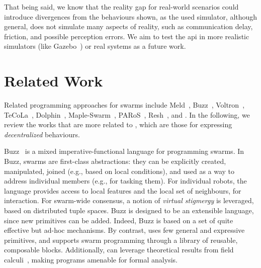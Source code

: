 That being said, we know that the reality gap for real-world scenarios could introduce divergences from the behaviours shown, as the used simulator, although general, does not simulate many aspects of reality, such as communication delay, friction, and possible perception errors. 
%
We aim to test the \ac{api} in more realistic simulators (like Gazebo~\cite{DBLP:conf/iros/KoenigH04}) or real systems as a future work.

\section{Related Work}
\label{coordination2023-macro:sec:rw}

Related programming approaches for swarms 
 include 
 Meld~\cite{Meld2007},
 Buzz~\cite{DBLP:conf/iros/PinciroliB16},
 Voltron~\cite{Mottola2014voltron},
 TeCoLa~\cite{Koutsoubelias2016tecola},
 Dolphin~\cite{lima2018dolphin},
 Maple-Swarm~\cite{DBLP:conf/isola/KosakHBWHR20}, 
 PARoS~\cite{paros},
 Resh~\cite{DBLP:conf/icra/CarrollNS21}, 
 and \cite{DBLP:conf/iros/YiDLD0WY20}.
%
%
In the following, we review the works that are more related to \MacroSwarm{},
 which are those for expressing \emph{decentralized} behaviours.
 

Buzz~\cite{DBLP:conf/iros/PinciroliB16}
 is a mixed imperative-functional language for programming swarms.
%
%
In Buzz, swarms are first-class abstractions:
 they can be explicitly created,
 manipulated,
 joined (e.g., based on local conditions),
 and used as a way to address individual members (e.g., for tasking them). %
%
For individual robots, 
 the language provides access to local features
 and the local set of neighbours, for interaction.
%
For swarm-wide consensus, 
 a notion of \emph{virtual stigmergy} is leveraged,
 based on distributed tuple spaces.
%
Buzz is designed to be an extensible language, since new primitives can be added.
%
Indeed, Buzz is based on a set of quite effective but ad-hoc mechanisms.
%
By contrast, \MacroSwarm{} uses few general and expressive primitives, 
  and supports swarm programming
  through a library of reusable, composable blocks.
%
%
Additionally, \MacroSwarm{} can leverage theoretical results from field calculi~\cite{DBLP:journals/jlap/ViroliBDACP19,DBLP:journals/tomacs/ViroliABDP18}, making programs amenable for formal analysis.


